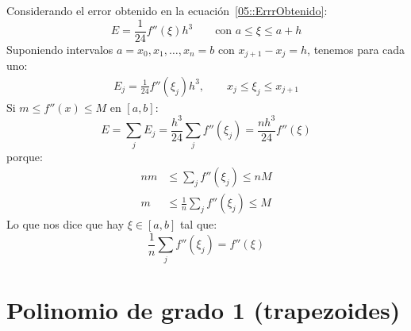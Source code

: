   Considerando el error obtenido en la ecuación~\eqref{05::ErrrObtenido}:
  \begin{equation}
    E
      = \frac{1}{24} f''(\xi) h^3
          \qquad \text{con \(a \le \xi \le a + h\)}
  \end{equation}
  Suponiendo intervalos \(a = x_0, x_1, \dotsc, x_n = b\)
  con \(x_{j + 1} - x_j = h\),
  tenemos para cada uno:
  \begin{align*}
    E_j
      = \frac{1}{24} f''(\xi_j) h^3, \qquad x_j \le \xi _j \le x_{j + 1}
  \end{align*}
  Si \(m \le f''(x) \le M\) en \([a, b]\):
  \begin{equation*}
    E
      = \sum_j E_j
      = \frac{h^3}{24} \sum_j f''(\xi _j)
      = \frac{n h^3}{24} f''(\xi)
  \end{equation*}
  porque:
  \begin{align*}
    n m
      &\le \sum_j f''(\xi_j) \le n M \\
    m
      &\le \frac{1}{n} \sum_j f''(\xi_j) \le M
  \end{align*}
  Lo que nos dice que hay \(\xi \in [a, b]\) tal que:
  \begin{equation*}
    \frac{1}{n} \sum_j f''(\xi_j)
      = f''(\xi)
  \end{equation*}

\section{Polinomio de grado 1 (trapezoides)}
\label{sec:trapezoides}

